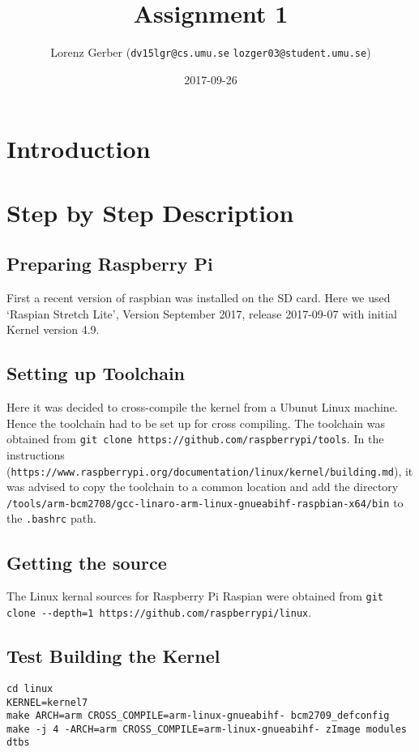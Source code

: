 \documentclass[a4paper,11pt,twoside]{article}
\title{Assignment 1}
\author{Lorenz Gerber ({\tt{dv15lgr@cs.umu.se}} {\tt{lozger03@student.umu.se}})}
\date{2017-09-26}
\begin{document}
\lstset{language=C}
\maketitle
\thispagestyle{empty}
\newpage

\clearpage
{}

\section{Introduction}

\section{Step by Step Description}
\subsection{Preparing Raspberry Pi}
First a recent version of raspbian was installed on the SD card. Here we used `Raspian
Stretch Lite', Version September 2017, release 2017-09-07 with initial Kernel version
4.9.

\subsection{Setting up Toolchain}
Here it was decided to cross-compile the kernel from a Ubunut Linux machine. Hence
the toolchain had to be set up for cross compiling. The toolchain was obtained
from \verb+git clone https://github.com/raspberrypi/tools+. In the instructions
(\verb+https://www.raspberrypi.org/documentation/linux/kernel/building.md+), it
was advised to copy the toolchain to a common location and add the directory
\verb+/tools/arm-bcm2708/gcc-linaro-arm-linux-gnueabihf-raspbian-x64/bin+ to
the \verb+.bashrc+ path.
\subsection{Getting the source}
The Linux kernal sources for Raspberry Pi Raspian were obtained from
\verb+git clone --depth=1 https://github.com/raspberrypi/linux+.

\subsection{Test Building the Kernel}
\begin{verbatim}
cd linux
KERNEL=kernel7
make ARCH=arm CROSS_COMPILE=arm-linux-gnueabihf- bcm2709_defconfig
make -j 4 -ARCH=arm CROSS_COMPILE=arm-linux-gnueabihf- zImage modules dtbs
\end{verbatim}
\end{document}
